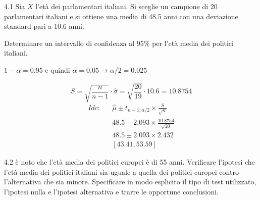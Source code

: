 \documentclass[
  11pt,
]{book}
\theoremstyle{mytheoremstyle}
\theoremstyle{mydefstyle}
\newenvironment{sol}
  {
  \begin{tcolorbox}[enhanced,breakable,arc=0.1mm,boxrule=1pt,colback=white,colframe=iblue,
  title=\bf \fontfamily{lmss}\selectfont \hspace{.5 cm} Soluzione,drop fuzzy shadow]

}{
\end{tcolorbox}
  }
\begin{document}
4.1 Sia \(X\) l'età dei parlamentari italiani.
Si sceglie un campione di 20 parlamentari italiani e si ottiene una
media di 48.5 anni con una deviazione standard pari a 10.6 anni.

Determinare un intervallo di confidenza al 95\% per
l'età media dei politici italiani.

\begin{sol}
\(1-\alpha =0.95\) e quindi \(\alpha=0.05\rightarrow \alpha/2=0.025\)

\[
      S  =\sqrt{\frac {n}{n-1}}\cdot\hat\sigma =
     \sqrt{\frac { 20 }{ 19 }}\cdot 10.6 = 10.8754 
\]
\begin{eqnarray*}
  Idc: & &  \hat\mu \pm  t_{n-1;\alpha/2} \times \frac{S}{\sqrt{n}} \\
     & &  48.5 \pm  2.093 \times \frac{ 10.8754 }{\sqrt{ 20 }} \\
     & &  48.5 \pm  2.093 \times  2.432 \\
     & & [ 43.41 ,  53.59 ]
\end{eqnarray*}

\end{sol}

4.2 è noto che l'età media dei politici europei
è di 55 anni.
Verificare l'ipotesi
che l'età media dei politici italiani sia uguale a quella
dei politici europei contro l'alternativa che sia minore.
Specificare in modo esplicito il tipo di test utilizzato,
l'ipotesi nulla e l'ipotesi alternativa e trarre le opportune
conclusioni.
\end{document}

